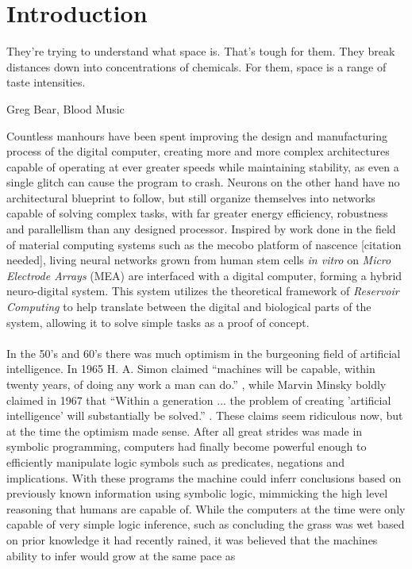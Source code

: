 \chapter{Introduction}
\epigraph{They're trying to understand what space is. That's tough for them.
They break distances down into concentrations of chemicals. For them, space is a
range of taste intensities.}{Greg Bear, Blood Music}
Countless manhours have been spent improving the design and manufacturing
process of the digital computer, creating more and more complex architectures
capable of operating at ever greater speeds while maintaining stability, as even
a single glitch can cause the program to crash.
%
Neurons on the other hand have no architectural blueprint to follow, but still
organize themselves into networks capable of solving complex tasks, with far
greater energy efficiency, robustness and parallellism than any designed
processor.
%
Inspired by work done in the field of material computing systems such as the
mecobo platform of nascence [citation needed], living neural networks grown from
human stem cells \emph{in vitro} on \emph{Micro Electrode Arrays} (MEA) are interfaced
with a digital computer, forming a hybrid neuro-digital system.
%
This system utilizes the theoretical framework of \emph{Reservoir Computing} to
help translate between the digital and biological parts of the system, allowing
it to solve simple tasks as a proof of concept.\\ \\
In the 50's and 60's there was much optimism in the burgeoning field of
artificial intelligence. In 1965 H. A. Simon claimed ``machines will be capable,
within twenty years, of doing any work a man can
do.''\cite{vardi_artificial_nodate} , while Marvin Minsky boldly claimed in 1967
that ``Within a generation ... the problem of creating 'artificial intelligence'
will substantially be solved.'' \cite{noauthor_marvin_nodate}.
These claims seem ridiculous now, but at the time the optimism made sense. After
all great strides was made in symbolic programming, computers had finally become
powerful enough to efficiently manipulate logic symbols such as predicates,
negations and implications. With these programs the machine could inferr
conclusions based on previously known information using symbolic logic,
mimmicking the high level reasoning that humans are capable of. While the
computers at the time were only capable of very simple logic inference, such as
concluding the grass was wet based on prior knowledge it had recently rained, it
was believed that the machines ability to infer would grow at the same pace as
